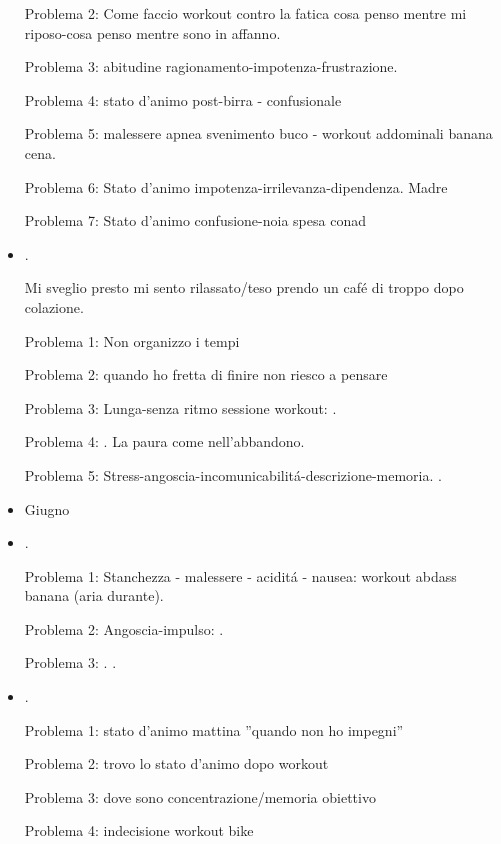 \begin{itemize}
Problema 2: Come faccio workout contro la fatica cosa penso mentre mi riposo-cosa penso mentre sono in affanno.

Problema 3: abitudine ragionamento-impotenza-frustrazione.

Problema 4: stato d'animo post-birra - confusionale

Problema 5: malessere apnea svenimento buco - workout addominali banana cena.

Problema 6: Stato d'animo impotenza-irrilevanza-dipendenza. Madre

Problema 7: Stato d'animo confusione-noia spesa conad  

\item {}.

Mi sveglio presto mi sento rilassato/teso prendo un caf\'e di troppo dopo colazione.

Problema 1: Non organizzo i tempi

Problema 2: quando ho fretta di finire non riesco a pensare

Problema 3: Lunga-senza ritmo sessione workout: .

Problema 4: . La paura come nell'abbandono.

Problema 5: Stress-angoscia-incomunicabilit\'a-descrizione-memoria. .

\item Giugno

\item {}.

Problema 1: Stanchezza - malessere - acidit\'a - nausea: workout abdass banana (aria durante).

Problema 2: Angoscia-impulso: .

Problema 3: .  .

\item {}.

Problema 1: stato d'animo mattina ''quando non ho impegni''

Problema 2: trovo lo stato d'animo dopo workout

Problema 3: dove sono concentrazione/memoria obiettivo

Problema 4: indecisione workout bike


\end{itemize}
